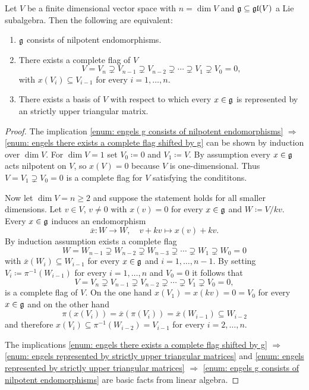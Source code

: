 \begin{prop}\label{prop: stuff for Engels theorem}
 Let $V$ be a finite dimensional vector space with $n = \dim V$ and $\mathfrak{g} \subseteq \mathfrak{gl}(V)$ a Lie subalgebra. Then the following are equivalent:
 \begin{enumerate}
  \item\label{enum: engels g consists of nilpotent endomorphisms}
   $\mathfrak{g}$ consists of nilpotent endomorphisms.
  \item\label{enum: engels there exists a complete flag shifted by g}
   There exists a complete flag of $V$
   \[
    V = V_n \supsetneq V_{n-1} \supsetneq V_{n-2} \supsetneq \dotsb \supsetneq V_1 \supsetneq V_0 = 0,
   \]
   with $x(V_i) \subseteq V_{i-1}$ for every $i = 1, \dotsc, n$.
  \item\label{enum: engels represented by strictly upper triangular matrices}
   There exists a basis of $V$ with respect to which every $x \in \mathfrak{g}$ is represented by an strictly upper triangular matrix.
 \end{enumerate}
\end{prop}
\begin{proof}
 The implication \ref{enum: engels g consists of nilpotent endomorphisms} $\Rightarrow$ \ref{enum: engels there exists a complete flag shifted by g} can be shown by induction over $\dim V$. For $\dim V = 1$ set $V_0 \coloneqq 0$ and $V_1 \coloneqq V$. By assumption every $x \in \mathfrak{g}$ acts nilpotent on $V$, so $x(V) = 0$ because $V$ is one-dimensional. Thus $V = V_1 \supsetneq V_0 = 0$ is a complete flag for $V$ satisfying the condititons.
   
 Now let $\dim V = n \geq 2$ and suppose the statement holds for all smaller dimensions. Let $v \in V$, $v \neq 0$ with $x(v) = 0$ for every $x \in \mathfrak{g}$ and $W \coloneqq V / kv$. Every $x \in \mathfrak{g}$ induces an endomorphism
 \[
  \overline{x} \colon W \to W, \quad v + kv \mapsto x(v) + kv.
 \]
 By induction assumption exists a complete flag
 \[
  W = W_{n-1} \supsetneq W_{n-2} \supsetneq W_{n-3} \supsetneq \dotsb \supsetneq W_1 \supsetneq W_0 = 0
 \]
 with $\overline{x}(W_i) \subseteq W_{i-1}$ for every $x \in \mathfrak{g}$ and $i = 1, \dotsc, n-1$. By setting $V_i \coloneqq \pi^{-1}(W_{i-1})$ for every $i = 1, \dotsc, n$ and $V_0 = 0$ it follows that
 \[
  V = V_n \supsetneq V_{n-1} \supsetneq V_{n-2} \supsetneq \dotsb \supsetneq V_1 \supsetneq V_0 = 0,
 \]
 is a complete flag of $V$. On the one hand $x(V_1) = x(kv) = 0 = V_0$ for every $x \in \mathfrak{g}$ and on the other hand
 \[
  \pi(x(V_i))
  = \overline{x}(\pi(V_i))
  = \overline{x}(W_{i-1})
  \subseteq W_{i-2}
 \]
 and therefore $x(V_i) \subseteq \pi^{-1}(W_{i-2}) = V_{i-1}$ for every $i = 2, \dotsc, n$.
 
 The implications \ref{enum: engels there exists a complete flag shifted by g} $\Rightarrow$ \ref{enum: engels represented by strictly upper triangular matrices} and \ref{enum: engels represented by strictly upper triangular matrices} $\Rightarrow$ \ref{enum: engels g consists of nilpotent endomorphisms} are basic facts from linear algebra.
\end{proof}


